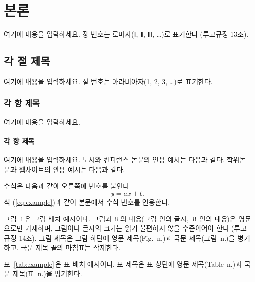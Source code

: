 \section{본\hspace{0.5em}론}

여기에 내용을 입력하세요. 장 번호는 로마자(Ⅰ, Ⅱ, Ⅲ, \ldots)로 표기한다
(투고규정 13조).

\subsection{각 절 제목}

여기에 내용을 입력하세요. 절 번호는 아라비아자(1, 2, 3, \ldots)로 표기한다.

\subsubsection{각 항 제목}

여기에 내용을 입력하세요.

\paragraph{각 항 제목}

여기에 내용을 입력하세요. 도서와 컨퍼런스 논문의 인용 예시는 다음과
같다\cite{craig2004robotics,nasridnov2013visual}. 학위논문과 웹사이트의 인용
예시는 다음과 같다\cite{shannon1938symbolic,wright2015website}.

수식은 다음과 같이 오른쪽에 번호를 붙인다.
\begin{equation}
y = ax + b.
\label{eq:example}
\end{equation}
식 (\ref{eq:example})과 같이 본문에서 수식 번호를 인용한다.

그림~\ref{fig:example}\,은 그림 배치 예시이다. 그림과 표의 내용(그림 안의
글자, 표 안의 내용)은 영문으로만 기재하며, 그림이나 글자의 크기는 읽기
불편하지 않을 수준이어야 한다 (투고규정 14조). 그림 제목은 그림 하단에 영문
제목(Fig.~n.)과 국문 제목(그림~n.)을 병기하고, 국문 제목 끝의 마침표는
삭제한다.

\begin{figure}[t]
\centering
{}
\label{fig:example}
\end{figure}

표~\ref{tab:example}\,은 표 배치 예시이다. 표 제목은 표 상단에 영문
제목(Table~n.)과 국문 제목(표~n.)을 병기한다.

